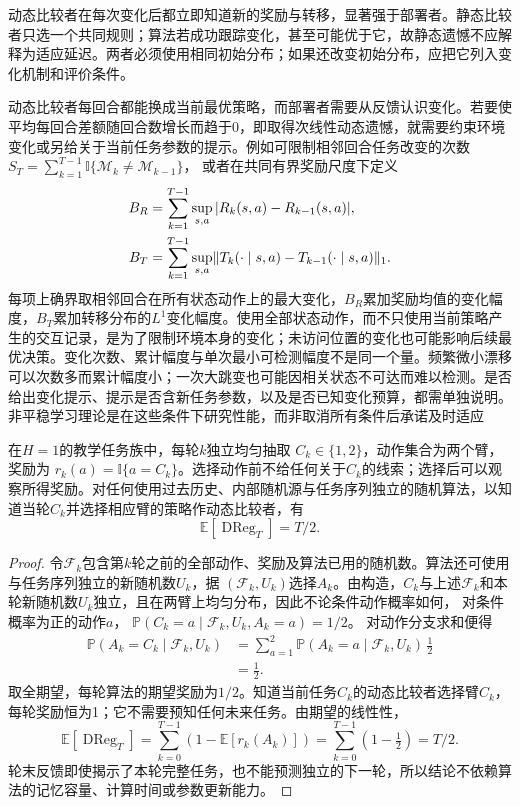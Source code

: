 动态比较者在每次变化后都立即知道新的奖励与转移，显著强于部署者。静态比较者只选一个共同规则；算法若成功跟踪变化，甚至可能优于它，故静态遗憾不应解释为适应延迟。两者必须使用相同初始分布；如果还改变初始分布，应把它列入变化机制和评价条件。

动态比较者每回合都能换成当前最优策略，而部署者需要从反馈认识变化。若要使平均每回合差额随回合数增长而趋于0，即取得次线性动态遗憾，就需要约束环境变化或另给关于当前任务参数的提示。例如可限制相邻回合任务改变的次数
$S_T=\sum_{k=1}^{T-1}\mathbb I\{\mathcal M_k\ne\mathcal M_{k-1}\}$，
或者在共同有界奖励尺度下定义
\begin{align}
 B_R&=\sum_{k=1}^{T-1}\sup_{s,a}|R_k(s,a)-R_{k-1}(s,a)|,\notag\\
 B_T&=\sum_{k=1}^{T-1}\sup_{s,a}
 \lVert T_k(\cdot\mid s,a)-T_{k-1}(\cdot\mid s,a)\rVert_1.
 \label{eq:rl-transfer-variation}
\end{align}
每项上确界取相邻回合在所有状态动作上的最大变化，$B_R$累加奖励均值的变化幅度，$B_T$累加转移分布的$L^1$变化幅度。使用全部状态动作，而不只使用当前策略产生的交互记录，是为了限制环境本身的变化；未访问位置的变化也可能影响后续最优决策。变化次数、累计幅度与单次最小可检测幅度不是同一个量。频繁微小漂移可以次数多而累计幅度小；一次大跳变也可能因相关状态不可达而难以检测。是否给出变化提示、提示是否含新任务参数，以及是否已知变化预算，都需单独说明。非平稳学习理论是在这些条件下研究性能，而非取消所有条件后承诺及时适应

\begin{theorem}[无预告快速变化的两臂下界]
 \label{thm:rl-transfer-linear-regret}
 在$H=1$的教学任务族中，每轮$k$独立均匀抽取
 $C_k\in\{1,2\}$，动作集合为两个臂，奖励为
 $r_k(a)=\mathbb I\{a=C_k\}$。选择动作前不给任何关于$C_k$的线索；选择后可以观察所得奖励。对任何使用过去历史、内部随机源与任务序列独立的随机算法，以知道当轮$C_k$并选择相应臂的策略作动态比较者，有
 \[
 \mathbb E[\operatorname{DReg}_T]=T/2.
 \]
\end{theorem}

\begin{proof}
 令$\mathcal F_k$包含第$k$轮之前的全部动作、奖励及算法已用的随机数。算法还可使用与任务序列独立的新随机数$U_k$，据
 $(\mathcal F_k,U_k)$选择$A_k$。由构造，$C_k$与上述$\mathcal F_k$和本轮新随机数$U_k$独立，且在两臂上均匀分布，因此不论条件动作概率如何，
 对条件概率为正的动作$a$，
 $\mathbb P(C_k=a\mid\mathcal F_k,U_k,A_k=a)=1/2$。
 对动作分支求和便得
 \begin{align*}
 \mathbb P(A_k=C_k\mid\mathcal F_k,U_k)
 &=\sum_{a=1}^2
    \mathbb P(A_k=a\mid\mathcal F_k,U_k)\,\tfrac12\\
 &=\tfrac12.
 \end{align*}
 取全期望，每轮算法的期望奖励为$1/2$。知道当前任务$C_k$的动态比较者选择臂$C_k$，每轮奖励恒为1；它不需要预知任何未来任务。由期望的线性性，
 \[
 \mathbb E[\operatorname{DReg}_T]
 =\sum_{k=0}^{T-1}\left(1-\mathbb E[r_k(A_k)]\right)
 =\sum_{k=0}^{T-1}(1-\tfrac12)=T/2.
 \]
 轮末反馈即使揭示了本轮完整任务，也不能预测独立的下一轮，所以结论不依赖算法的记忆容量、计算时间或参数更新能力。
\end{proof}

